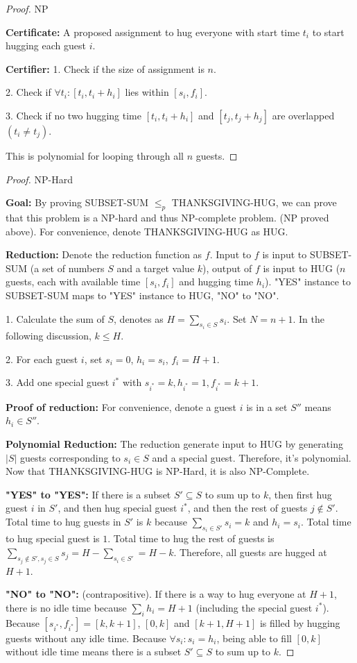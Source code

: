 \documentclass[openany]{article}
\begin{document}
\begin{proof}{NP}

\textbf{Certificate:} A proposed assignment to hug everyone with start time $t_i$ to start hugging each guest $i$.

\textbf{Certifier:} 1. Check if the size of assignment is $n$.

2. Check if $\forall t_i: [t_i, t_i+h_i]$ lies within $[s_i, f_i]$.

3. Check if no two hugging time $[t_i, t_i+h_i]$ and $[t_j, t_j+h_j]$ are overlapped $(t_i \neq t_j)$.

This is polynomial for looping through all $n$ guests.
\end{proof}

\begin{proof}{NP-Hard}

\textbf{Goal:} By proving SUBSET-SUM $\leqslant_p$ THANKSGIVING-HUG, we can prove that this problem is a NP-hard and thus NP-complete problem. (NP proved above). For convenience, denote THANKSGIVING-HUG as HUG.

\textbf{Reduction:} Denote the reduction function as $f$. Input to $f$ is input to SUBSET-SUM (a set of numbers $S$ and a target value $k$), output of $f$ is input to HUG ($n$ guests, each with available time $[s_i, f_i]$ and hugging time $h_i$). "YES" instance to SUBSET-SUM maps to "YES" instance to HUG, "NO" to "NO". 

1. Calculate the sum of $S$, denotes as $H = \sum_{s_i\in S}s_i$. Set $N = n+1$. In the following discussion, $k \leqslant H$.

2. For each guest $i$, set $s_i = 0$, $h_i=s_i$, $f_i = H+1$. 

3. Add one special guest $i^*$ with $s_{i^*} = k, h_{i^*} = 1, f_{i^*} = k+1$.


\textbf{Proof of reduction:} For convenience, denote a guest $i$ is in a set $S''$ means $h_i\in S''$.

\textbf{Polynomial Reduction:} The reduction generate input to HUG by generating $|S|$ guests corresponding to $s_i\in S$ and a special guest. Therefore, it's polynomial. Now that THANKSGIVING-HUG is NP-Hard, it is also NP-Complete.

\textbf{"YES" to "YES":} If there is a subset $S' \subseteq S$ to sum up to $k$, then first hug guest $i$ in $S'$, and then hug special guest $i^*$, and then the rest of guests $j  \not\in S'$. Total time to hug guests in $S'$ is $k$ because $\sum_{s_i\in S'}s_i = k $ and $h_i = s_i$. Total time to hug special guest is $1$. Total time to hug the rest of guests is $\sum_{s_j\notin S', s_j\in S} s_j = H-\sum_{s_i\in S'} = H-k$. Therefore, all guests are hugged at $H+1$.


\textbf{"NO" to "NO":} (contrapositive). If there is a way to hug everyone at $H+1$, there is no idle time because $\sum_i h_i = H+1$ (including the special guest $i^*$). Because $[s_{i^*},f_{i^*}] = [k, k+1]$, $[0,k]$ and $[k+1, H+1]$ is filled by hugging guests without any idle time. Because $\forall s_i: s_i=h_i$, being able to fill $[0,k]$ without idle time means there is a subset $S' \subseteq S$ to sum up to $k$.


\end{proof}
\end{document}
